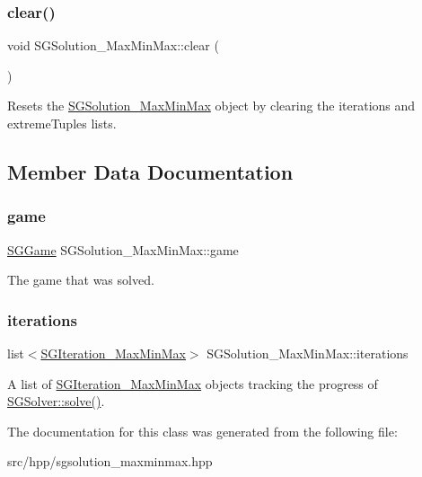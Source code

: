 \subsubsection{\texorpdfstring{clear()}{clear()}}
{\footnotesize\ttfamily void S\+G\+Solution\+\_\+\+Max\+Min\+Max\+::clear (\begin{DoxyParamCaption}{ }\end{DoxyParamCaption})\hspace{0.3cm}{\ttfamily [inline]}}

Resets the \hyperlink{classSGSolution__MaxMinMax}{S\+G\+Solution\+\_\+\+Max\+Min\+Max} object by clearing the iterations and extreme\+Tuples lists. 

\subsection{Member Data Documentation}
\mbox{\label{classSGSolution__MaxMinMax_a5d4ad64f86fcd34f2e25ea06c17e6efc}} 
\subsubsection{\texorpdfstring{game}{game}}
{\footnotesize\ttfamily \hyperlink{classSGGame}{S\+G\+Game} S\+G\+Solution\+\_\+\+Max\+Min\+Max\+::game\hspace{0.3cm}{\ttfamily [private]}}

The game that was solved. \mbox{\label{classSGSolution__MaxMinMax_a119ccef307a2964b6b16e8ba2af547fd}} 
\subsubsection{\texorpdfstring{iterations}{iterations}}
{\footnotesize\ttfamily list$<$\hyperlink{classSGIteration__MaxMinMax}{S\+G\+Iteration\+\_\+\+Max\+Min\+Max}$>$ S\+G\+Solution\+\_\+\+Max\+Min\+Max\+::iterations\hspace{0.3cm}{\ttfamily [private]}}

A list of \hyperlink{classSGIteration__MaxMinMax}{S\+G\+Iteration\+\_\+\+Max\+Min\+Max} objects tracking the progress of \hyperlink{classSGSolver_a220dd431eabdd9ff8419fafb28b7b990}{S\+G\+Solver\+::solve()}. 

The documentation for this class was generated from the following file\+:\begin{DoxyCompactItemize}
\item 
src/hpp/sgsolution\+\_\+maxminmax.\+hpp\end{DoxyCompactItemize}
